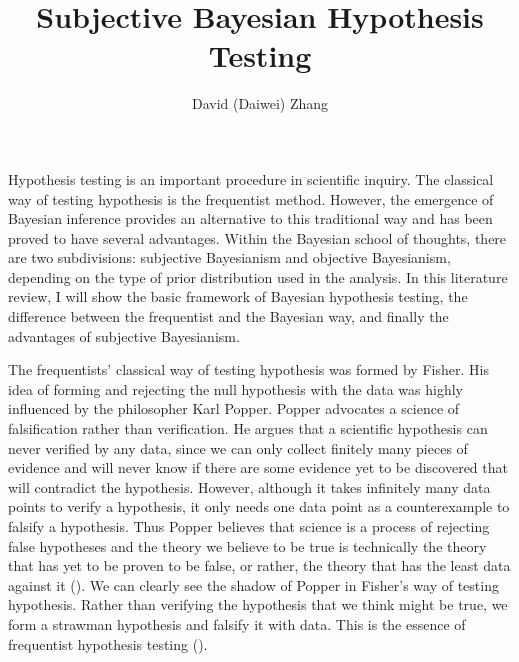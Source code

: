 \message{ !name(biostat830_literatureReview.tex)}\documentclass[12pt]{article} \usepackage[nolists]{endfloat}
\begin{document}

\setlength{\textheight}{625pt} \setlength{\baselineskip}{23pt}

\title{Subjective Bayesian Hypothesis Testing} \author{David (Daiwei)
  Zhang}
\maketitle

\noindent
Hypothesis testing is an important procedure in scientific
inquiry. The classical way of testing hypothesis is the frequentist
method.  However, the emergence of Bayesian inference provides an
alternative to this traditional way and has been proved to have
several advantages.  Within the Bayesian school of thoughts, there are
two subdivisions: subjective Bayesianism and objective Bayesianism,
depending on the type of prior distribution used in the analysis.  In
this literature review, I will show the basic framework of Bayesian
hypothesis testing, the difference between the frequentist and the
Bayesian way, and finally the advantages of subjective Bayesianism.

The frequentists' classical way of testing hypothesis was formed by
Fisher.  His idea of forming and rejecting the null hypothesis with
the data was highly influenced by the philosopher Karl Popper.  Popper
advocates a science of falsification rather than verification.  He
argues that a scientific hypothesis can never verified by any data,
since we can only collect finitely many pieces of evidence and will
never know if there are some evidence yet to be discovered that will
contradict the hypothesis.  However, although it takes infinitely many
data points to verify a hypothesis, it only needs one data point as a
counterexample to falsify a hypothesis.  Thus Popper believes that
science is a process of rejecting false hypotheses and the theory we
believe to be true is technically the theory that has yet to be proven
to be false, or rather, the theory that has the least data against it
(\cite{thornton}).  We can clearly see the shadow of Popper in
Fisher's way of testing hypothesis.  Rather than verifying the
hypothesis that we think might be true, we form a strawman hypothesis
and falsify it with data.  This is the essence of frequentist
hypothesis testing (\cite{press}).
\end{document}
